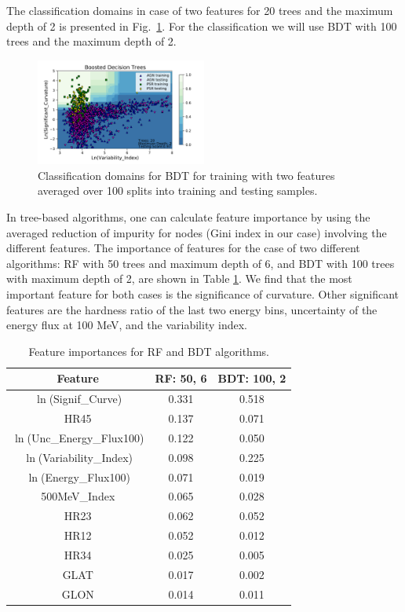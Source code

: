 \documentclass{aa}
\begin{document}
The classification domains in case of two features for 20 trees and the maximum depth of 2 is presented in Fig.~\ref{fig:BDT_domains}. 
For the classification we will use BDT with 100 trees and the maximum depth of 2.


\begin{figure}[h]
\centering
\includegraphics[width=0.5\textwidth]{plots/classification_domains/bdt_20_2.pdf}
\caption{Classification domains for BDT for training with two features 
averaged over 100 splits into training and testing samples.
}
\label{fig:BDT_domains}
\end{figure}



In tree-based algorithms, one can calculate feature importance by using the averaged reduction of impurity for nodes (Gini index in our case) involving the different features. 
The importance of features for the case of two different algorithms: RF with 50 trees and maximum depth of 6, and BDT with 100 trees with maximum depth of 2,  are shown in Table \ref{tab:feat_imp}.
We find that the most important feature for both cases is the significance of curvature.
Other significant features are the hardness ratio of the last two energy bins, uncertainty of the energy flux at 100 MeV, and the variability index.


\begin{table}[!h]
\caption{Feature importances for RF and BDT algorithms.
}
\label{tab:feat_imp}
\tiny
\centering
\renewcommand{\tabcolsep}{1mm}
\renewcommand{\arraystretch}{1}

\begin{tabular}{c c c}
\hline
\hline
Feature & RF: 50, 6 & BDT: 100, 2\\
\hline
{ $\ln$(Signif\_Curve)}&  0.331  & 0.518   \\
{ HR45}&0.137&0.071\\
{ $\ln$(Unc\_Energy\_Flux100)} &0.122& 0.050   \\
$\ln$(Variability\_Index)& 0.098&0.225  \\
$\ln$(Energy\_Flux100) & 0.071&0.019   \\
500MeV\_Index&0.065& 0.028  \\
HR23 & 0.062&0.052  \\
HR12& 0.052&0.012  \\
HR34&0.025&0.005\\
GLAT &0.017& 0.002     \\
GLON & 0.014&0.011  \\
\hline
\end{tabular}
\end{table}
\end{document}
